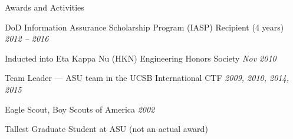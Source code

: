 \documentclass{resume} %
\begin{document}

\begin{rSection}{Awards and Activities}

  \begin{rBulletList}

  \item DoD Information Assurance Scholarship Program (IASP) Recipient (4 years) \hfill \emph{2012 -- 2016}

  \item Inducted into Eta Kappa Nu (HKN) Engineering Honors Society \hfill \emph{Nov 2010}

  \item Team Leader --- ASU team in the UCSB International CTF \hfill \emph{2009, 2010, 2014, 2015}

  \item Eagle Scout, Boy Scouts of America \hfill \emph{2002}

  \item Tallest Graduate Student at ASU \hfill (not an actual award)

  \end{rBulletList}

\end{rSection}





\end{document}
